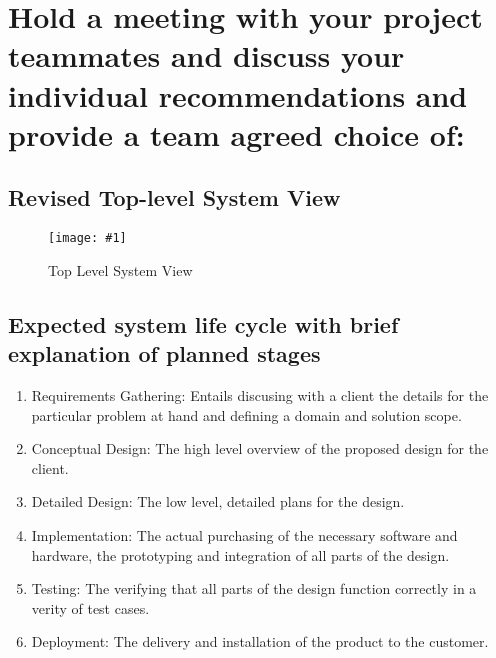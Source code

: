 \documentclass[12pt]{article} \usepackage{jeep} \usepackage{unicode}
\newcommand\createfigure[2]{
  \begin{figure}[H]
    \centering \texttt{[image: \#1]}
    \caption{#2}
  \end{figure}}
\begin{document}
\linespread{1.0}

\linespread{2.0}
\section{Hold a meeting with your project teammates and discuss your individual
  recommendations and provide a team agreed choice of:}
\subsection{Revised Top-level System View}
\createfigure{../Figures/global-system-view.png}{Top Level System View}
\subsection{Expected system life cycle with brief explanation of planned stages}
\begin{enumerate}
  \item Requirements Gathering: Entails discusing with a client the details for the particular problem at hand and defining a domain and solution scope.
  \item Conceptual Design: The high level overview of the proposed design for the client.
  \item Detailed Design: The low level, detailed plans for the design.
  \item Implementation: The actual purchasing of the necessary software and hardware, the prototyping and integration of all parts of the design.
  \item Testing: The verifying that all parts of the design function correctly in a verity of test cases.
  \item Deployment: The delivery and installation of the product to the customer.
\end{enumerate}
\end{document}
